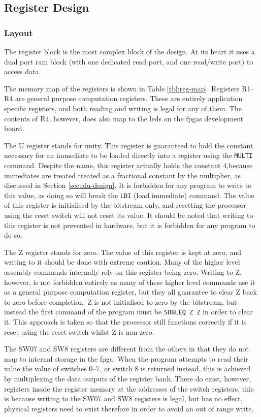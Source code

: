 \subsection{Register Design}
\subsubsection{Layout}

The register block is the most complex block of the design. At its heart it uses a dual port \gls{ram} block (with one dedicated read port, and one read/write port) to access data.

The memory map of the registers is shown in Table \ref{tbl:reg-map}. Registers R1--R4 are general purpose computation registers. These are entirely application specific registers, and both reading and writing is legal for any of them. The contents of R4, however, does also map to the \glspl{led} on the \glspl{fpga} development board.

The U register stands for unity. This register is guaranteed to hold the constant necessary for an immediate to be loaded directly into a register using the \texttt{MULTI} command. Despite the name, this register actually holds the constant $4$,because immediates are treated treated as a fractional constant by the multiplier, as discussed in Section \ref{sec:alu-design}. It is forbidden for any program to write to this value, as doing so will break the \texttt{LDI} (load immediate) command. The value of this register is initialised by the bitstream only, and resetting the processor using the reset switch will not reset its value. It should be noted that writing to this register is not prevented in hardware, but it is forbidden for any program to do so.

The Z register stands for zero. The value of this register is kept at zero, and writing to it should be done with extreme caution. Many of the higher level assembly commands internally rely on this register being zero. Writing to Z, however, is not forbidden entirely as many of these higher level commands use it as a general purpose computation register, but they all guarantee to clear Z back to zero before completion. Z is not initialised to zero by the bitstream, but instead the first command of the program must be \texttt{SUBLEQ Z Z} in order to clear it. This approach is taken so that the processor still functions correctly if it is reset using the reset switch whilst Z is non-zero.

The SW07 and SW8 registers are different from the others in that they do not map to internal storage in the \gls{fpga}. When the program attempts to read their value the value of switches 0--7, or switch 8 is returned instead, this is achieved by multiplexing the data outputs of the register bank. There do exist, however, registers inside the register memory at the addresses of the switch registers, this is because writing to the SW07 and SW8 registers is legal, but has no effect, physical registers need to exist therefore in order to avoid an out of range write.



